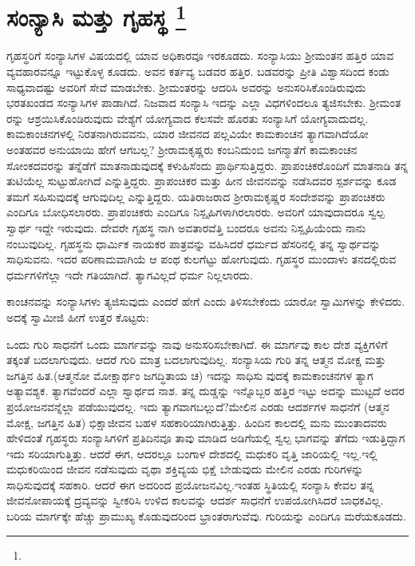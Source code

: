 
\chapter[ಸಂನ್ಯಾಸಿ ಮತ್ತು ಗೃಹಸ್ಥ ]{ಸಂನ್ಯಾಸಿ ಮತ್ತು ಗೃಹಸ್ಥ \protect\footnote{}}

ಗೃಹಸ್ಥರಿಗೆ ಸಂನ್ಯಾಸಿಗಳ ವಿಷಯದಲ್ಲಿ ಯಾವ ಅಧಿಕಾರವೂ ಇರಕೂಡದು. ಸಂನ್ಯಾಸಿಯು ಶ‍್ರೀಮಂತನ ಹತ್ತಿರ ಯಾವ ವ್ಯವಹಾರವನ್ನೂ ಇಟ್ಟುಕೊಳ್ಳ ಕೂಡದು. ಅವನ ಕರ್ತವ್ಯ ಬಡವರ ಹತ್ತಿರ. ಬಡವರನ್ನು ಪ್ರೀತಿ ವಿಶ್ವಾಸದಿಂದ ಕಂಡು ಸಾಧ್ಯವಾದಷ್ಟು ಅವರಿಗೆ ಸೇವೆ ಮಾಡಬೇಕು. ಶ‍್ರೀಮಂತರನ್ನು ಆದರಿಸಿ ಅವರನ್ನು ಅನುಸರಿಸಿಕೊಂಡಿರುವುದು ಭರತಖಂಡದ ಸಂನ್ಯಾಸಿಗಳ ಪಾಡಾಗಿದೆ. ನಿಜವಾದ ಸಂನ್ಯಾಸಿ ಇದನ್ನು ಎಲ್ಲಾ ವಿಧಗಳಿಂದಲೂ ತ್ಯಜಿಸಬೇಕು. ಶ‍್ರೀಮಂತ ರನ್ನು ಆಶ್ರಯಿಸಿಕೊಂಡಿರುವುದು ವೇಶ್ಯೆಗೆ ಯೋಗ್ಯವಾದ ಕೆಲಸವೇ ಹೊರತು ಸಂನ್ಯಾಸಿಗೆ ಯೋಗ್ಯವಾದುದಲ್ಲ. ಕಾಮಕಾಂಚನಗಳಲ್ಲಿ ನಿರತನಾಗಿರುವವನು, ಯಾರ ಜೀವನದ ಪಲ್ಲವಿಯೇ ಕಾಮಕಾಂಚನ ತ್ಯಾಗವಾಗಿದೆಯೋ ಅಂತಹವರ ಅನುಯಾಯಿ ಹೇಗೆ ಆಗಬಲ್ಲ? ಶ‍್ರೀರಾಮಕೃಷ್ಣರು ಕಂಬನಿದುಂಬಿ ಜಗನ್ಮಾತೆಗೆ ಕಾಮಕಾಂಚನ ಸೋಂಕದವರನ್ನು ತನ್ನೆಡೆಗೆ ಮಾತನಾಡುವುದಕ್ಕೆ ಕಳುಹಿಸೆಂದು ಪ್ರಾರ್ಥಿಸುತ್ತಿದ್ದರು. ಪ್ರಾಪಂಚಿಕರೊಂದಿಗೆ ಮಾತನಾಡಿ ತನ್ನ ತುಟಿಯೆಲ್ಲ ಸುಟ್ಟುಹೋಗಿದೆ ಎನ್ನುತ್ತಿದ್ದರು. ಪ್ರಾಪಂಚಿಕರ ಮತ್ತು ಹೀನ ಜೀವನವನ್ನು ನಡೆಸಿದವರ ಸ್ಪರ್ಶವನ್ನು ಕೂಡ ತಮಗೆ ಸಹಿಸುವುದಕ್ಕೆ ಆಗುವುದಿಲ್ಲ ಎನ್ನುತ್ತಿದ್ದರು. ಯತಿರಾಜರಾದ ಶ‍್ರೀರಾಮಕೃಷ್ಣರ ಸಂದೇಶವನ್ನು ಪ್ರಾಪಂಚಿಕರು ಎಂದಿಗೂ ಬೋಧಿಸಲಾರರು. ಪ್ರಾಪಂಚಿಕರು ಎಂದಿಗೂ ನಿಸ್ಪೃಹಿಗಳಾಗಿರಲಾರರು. ಅವರಿಗೆ ಯಾವುದಾದರೂ ಸ್ವಲ್ಪ ಸ್ವಾರ್ಥ ಇದ್ದೇ ಇರುವುದು. ದೇವರೇ ಗೃಹಸ್ಥ ನಾಗಿ ಅವತಾರವೆತ್ತಿ ಬಂದರೂ ಅವನು ನಿಸ್ಪೃಹಿಯೆಂದು ನಾನು ನಂಬುವುದಿಲ್ಲ. ಗೃಹಸ್ಥನು ಧಾರ್ಮಿಕ ನಾಯಕರ ಪಾತ್ರವನ್ನು ವಹಿಸಿದರೆ ಧರ್ಮದ ಹೆಸರಿನಲ್ಲಿ ತನ್ನ ಸ್ವಾರ್ಥವನ್ನು ಸಾಧಿಸುವನು. ಇದರ ಪರಿಣಾಮವಾಗಿಯೆ ಆ ಪಂಥ ಕುಲಗೆಟ್ಟು ಹೋಗುವುದು. ಗೃಹಸ್ಥರ ಮುಂದಾಳು ತನದಲ್ಲಿರುವ ಧರ್ಮಗಳಿಗೆಲ್ಲಾ ಇದೇ ಗತಿಯಾಗಿದೆ. ತ್ಯಾಗವಿಲ್ಲದೆ ಧರ್ಮ ನಿಲ್ಲಲಾರದು.

ಕಾಂಚನವನ್ನು ಸಂನ್ಯಾಸಿಗಳು ತ್ಯಜಿಸುವುದು ಎಂದರೆ ಹೇಗೆ ಎಂದು ತಿಳಿಸಬೇಕೆಂದು ಯಾರೋ ಸ್ವಾಮಿಗಳನ್ನು ಕೇಳಿದರು. ಅದಕ್ಕೆ ಸ್ವಾಮೀಜಿ ಹೀಗೆ ಉತ್ತರ ಕೊಟ್ಟರು:

ಒಂದು ಗುರಿ ಸಾಧನೆಗೆ ಒಂದು ಮಾರ್ಗವನ್ನು ನಾವು ಅನುಸರಿಸಬೇಕಾಗಿದೆ. ಈ ಮಾರ್ಗವು ಕಾಲ ದೇಶ ವ್ಯಕ್ತಿಗಳಿಗೆ ತಕ್ಕಂತೆ ಬದಲಾಗುವುದು. ಆದರೆ ಗುರಿ ಮಾತ್ರ ಬದಲಾಗುವುದಿಲ್ಲ. ಸಂನ್ಯಾಸಿಯ ಗುರಿ ತನ್ನ ಆತ್ಮನ ಮೋಕ್ಷ ಮತ್ತು ಜಗತ್ತಿನ ಹಿತ.(ಆತ್ಮನೋ ಮೋಕ್ಷಾರ್ಥಂ ಜಗದ್ಧಿತಾಯ ಚ) ಇದನ್ನು ಸಾಧಿಸು ವುದಕ್ಕೆ ಕಾಮಕಾಂಚನಗಳ ತ್ಯಾಗ ಅತ್ಯಾವಶ್ಯಕ. ತ್ಯಾಗವೆಂದರೆ ಎಲ್ಲಾ ಸ್ವಾರ್ಥದ ನಾಶ. ತನ್ನ ದುಡ್ಡನ್ನು ಇನ್ನೊಬ್ಬರ ಹತ್ತಿರ ಇಟ್ಟು ಅದನ್ನು ಮುಟ್ಟದೆ ಅದರ ಪ್ರಯೋಜನವನ್ನೆಲ್ಲಾ ಪಡೆಯುವುದಲ್ಲ. ಇದು ತ್ಯಾಗವಾಗಬಲ್ಲುದೆ?ಮೇಲಿನ ಎರಡು ಆದರ್ಶಗಳ ಸಾಧನೆಗೆ (ಆತ್ಮನ ಮೋಕ್ಷ, ಜಗತ್ತಿನ ಹಿತ) ಭಿಕ್ಷಾಜೀವನ ಬಹಳ ಸಹಕಾರಿಯಾಗಿರುತ್ತಿತ್ತು. ಹಿಂದಿನ ಕಾಲದಲ್ಲಿ ಮನು ಮುಂತಾದವರು ಹೇಳಿದಂತೆ ಗೃಹಸ್ಥರು ಸಂನ್ಯಾಸಿಗಳಿಗೆ ಪ್ರತಿದಿನವೂ ತಾವು ಮಾಡಿದ ಅಡಿಗೆಯಲ್ಲಿ ಸ್ವಲ್ಪ ಭಾಗವನ್ನು ತೆಗೆದು ಇಡುತ್ತಿದ್ದಾಗ ಇದು ಸರಿಯಾಗುತ್ತಿತ್ತು. ಆದರೆ ಈಗ, ಆದರಲ್ಲೂ ಬಂಗಾಳ ದೇಶದಲ್ಲಿ ಮಧುಕರಿ ವೃತ್ತಿ ಜಾರಿಯಲ್ಲಿ ಇಲ್ಲ.ಇಲ್ಲಿ ಮಧುಕರಿಯಿಂದ ಜೀವನ ನಡೆಸುವುದು ವೃಥಾ ಶಕ್ತಿವ್ಯಯ ಭಿಕ್ಷೆ ಬೇಡುವುದು ಮೇಲಿನ ಎರಡು ಗುರಿಗಳನ್ನು ಸಾಧಿಸುವುದಕ್ಕೆ ಸಹಕಾರಿ. ಆದರೆ ಈಗ ಅದರಿಂದ ಪ್ರಯೋಜನವಿಲ್ಲ.ಇಂತಹ ಸ್ಥಿತಿಯಲ್ಲಿ ಸಂನ್ಯಾಸಿ ಕೇವಲ ತನ್ನ ಜೀವನೋಪಾಯಕ್ಕೆ ದ್ರವ್ಯವನ್ನು ಸ್ವೀಕರಿಸಿ ಉಳಿದ ಕಾಲವನ್ನು ಆದರ್ಶ ಸಾಧನೆಗೆ ಉಪಯೋಗಿಸಿದರೆ ಬಾಧಕವಿಲ್ಲ. ಬರಿಯ ಮಾರ್ಗಕ್ಕೇ ಹೆಚ್ಚು ಪ್ರಾಮುಖ್ಯ ಕೊಡುವುದರಿಂದ ಭ್ರಾಂತರಾಗುವೆವು. ಗುರಿಯನ್ನು ಎಂದಿಗೂ ಮರೆಯಕೂಡದು.

